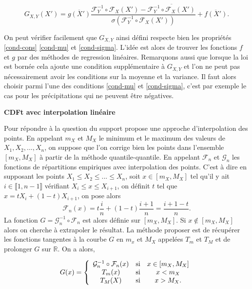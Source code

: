\documentclass[a4paper,11pt]{article}
\numberwithin{equation}{section}
\begin{document}
\[ G_{X,Y} (X')= \overline{g(X')}\frac{\mathcal{F}^{-1}_{Y}\circ\mathcal{F}_{X}(X')- \overline{\mathcal{F}^{-1}_{Y}\circ\mathcal{F}_{X}(X')}}{\sigma(\mathcal{F}^{-1}_{Y}\circ\mathcal{F}_{X}(X'))} + \overline{f(X')}.\]

On peut vérifier facilement que $G_{X,Y}$ ainsi défini respecte bien les propriétés \eqref{cond-cons} \eqref{cond-mu} et \eqref{cond-sigma}. L'idée est alors de trouver les fonctions $f$ et $g$ par des méthodes de regression linéaires. Remarquons aussi que lorsque la loi est bornée cela ajoute une condition supplémentaire à $G_{X,Y}$ et l'on ne peut pas nécessairement avoir les conditions sur la moyenne et la variance. Il faut alors choisir parmi l'une des conditions \eqref{cond-mu} et \eqref{cond-sigma}, c'est par exemple le cas pour les précipitations qui ne peuvent être négatives. 

\vspace{0.7cm}

\noindent \textbf{CDFt avec interpolation linéaire \cite{michelangeli2009probabilistic}}

Pour répondre à la question du support \cite{michelangeli2009probabilistic} propose une approche d'interpolation des points. En appelant $m_X$ et $M_X$ le minimum et le maximum des valeurs de $X_1, X_2,...,X_n$, on suppose que l'on corrige bien les points dans l'ensemble $[m_X,M_X]$ à partir de la méthode quantile-quantile. En appelant $\mathcal{F}_n$ et $\mathcal{G}_n$ les fonctions de répartitions empiriques avec interpolation des points. C'est à dire en supposant les points $X_1\leq X_2\leq ...\leq X_n$, soit $x \in [m_X,M_X]$ tel qu'il y ait $i \in \llbracket 1, n-1 \rrbracket$ vérifiant $X_i\leq x \leq X_{i+1}$, on définit $t$ tel que $x= t X_i+(1-t)X_{i+1}$, on pose alors
\[\mathcal{F}_n(x)= t\frac{i}{n} + (1-t)\frac{i+1}{n}= \frac{i+1-t}{n}.\]
La fonction $G=\mathcal{G}_n^{-1}\circ \mathcal{F}_n$ est alors définie sur $[m_X,M_X]$. Si $x \notin [m_X,M_X]$ alors on cherche à extrapoler le résultat. La méthode proposer est de récupérer les fonctions tangentes à la courbe $G$ en $m_x$ et $M_X$ appelées $T_m$ et $T_M$ et de prolonger $G$ sur $\mathbb{R}$. On a alors,

\begin{equation}
	G(x)=
	\left\lbrace
	\begin{array}{ccc}
		\mathcal{G}_n^{-1}\circ \mathcal{F}_n(x) & \hbox{si}& x\in [m_X,M_X]\\
		T_m(x) & \hbox{si} & x<m_X\\
		T_M(X) & \hbox{si} & x>M_X.
	\end{array}\right.
\end{equation}
\end{document}

